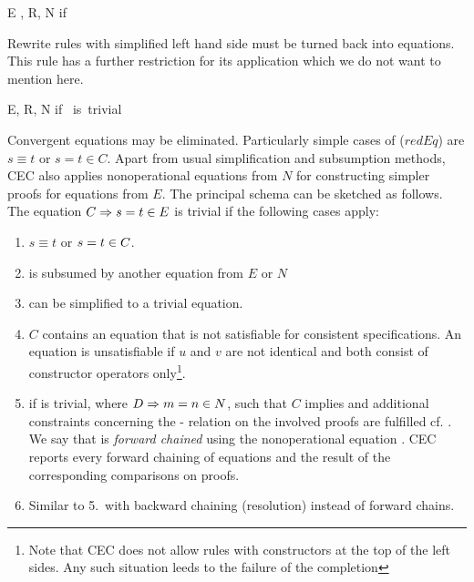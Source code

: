 \begin{CRule}
{ E \cup {}, R, N }if{
  }
\end{CRule}

\noindent
Rewrite rules with simplified left hand side must be turned back into equations.
This rule has a further restriction for its application which we do not want to
mention here.\bigskip

\begin{CRule}
{ E, R, N }if{ \mbox{{\rm \  is\ trivial}}}
\end{CRule}

\noindent
Convergent equations may be eliminated. Particularly simple cases of
($redEq$) are $s \equiv t$ or $ s=t \in C $. Apart from usual
simplification and subsumption methods, CEC also applies nonoperational
equations from $N$ for constructing simpler proofs for equations from $E$.
The principal schema can be sketched as follows. 
The equation $\condEq{C}{\eq{s}{t}} \in E$ is trivial if the following
cases apply:
\begin{enumerate}
\item
$s \equiv t$ or $\eq{s}{t} \in C$.
\item
{} is subsumed by another equation from $E$ or $N$
\item
{} can be simplified to a trivial equation.
\item
$C$ contains an equation  that is not satisfiable for consistent
specifications. 
An equation  is unsatisfiable if $u$ and $v$ are not identical and
both consist of constructor operators only\footnote[1]{Note that CEC does 
not allow rules with constructors at the top of the left sides. Any such
situation leeds to the failure of the completion}.
\item
if 
is trivial, where $\condEq{D}{\eq{m}{n}} \in N$, such that $C$ 
implies  
and additional constraints
concerning the \PO - relation on the involved proofs are fulfilled
cf. \cite{Gan87b}.
We say that  is {\it forward chained} using the nonoperational 
equation . CEC reports every forward chaining of equations and
the result of the corresponding comparisons on proofs.
\item
Similar to 5.\ with backward chaining (resolution) instead of forward chains.
\end{enumerate}

